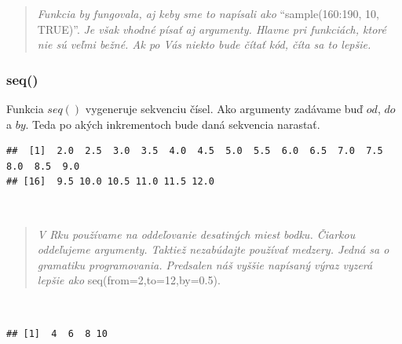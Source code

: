 \begin{quote}
\emph{Funkcia by fungovala, aj keby sme to napísali ako}
``sample(160:190, 10, TRUE)''. \emph{Je však vhodné písať aj argumenty.
Hlavne pri funkciách, ktoré nie sú veľmi bežné. Ak po Vás niekto bude
čítať kód, číta sa to lepšie.}
\end{quote}

\hypertarget{seq}{%
\subsubsection{seq()}\label{seq}}

Funkcia \(seq()\) vygeneruje sekvenciu čísel. Ako argumenty zadávame buď
\(od\), \(do\) a \(by\). Teda po akých inkrementoch bude daná sekvencia
narastať.

\begin{Shaded}
\begin{Highlighting}[]
\NormalTok{(} \NormalTok{, } \NormalTok{, } \NormalTok{)}
\end{Highlighting}
\end{Shaded}

\begin{verbatim}
##  [1]  2.0  2.5  3.0  3.5  4.0  4.5  5.0  5.5  6.0  6.5  7.0  7.5  8.0  8.5  9.0
## [16]  9.5 10.0 10.5 11.0 11.5 12.0
\end{verbatim}

~

\begin{quote}
\emph{V Rku používame na oddeľovanie desatiných miest bodku. Čiarkou
oddeľujeme argumenty. Taktiež nezabúdajte používať medzery. Jedná sa o
gramatiku programovania. Predsalen náš vyššie napísaný výraz vyzerá
lepšie ako} seq(from=2,to=12,by=0.5).
\end{quote}

~

\begin{Shaded}
\begin{Highlighting}[]

\NormalTok{(} \NormalTok{, } \NormalTok{, } \NormalTok{) }
\end{Highlighting}
\end{Shaded}

\begin{verbatim}
## [1]  4  6  8 10
\end{verbatim}

